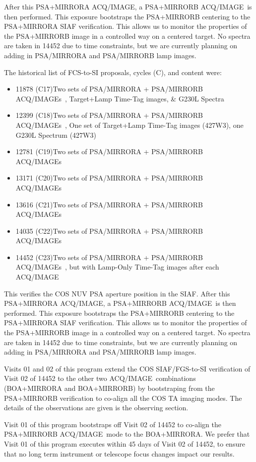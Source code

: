 \documentclass[12pt]{reportj}
\newcommand*{\myfont}{\fontfamily{rm}\selectfont}
\def\acqimageno{{\myfont ACQ/IMAGE}\rm}
\def\acqimage{{\myfont ACQ/IMAGE}\rm~}
\def\acqimages{{\myfont ACQ/IMAGE{\rm s}}\rm~}
\begin{document}
After this PSA+MIRRORA \acqimageno, a PSA+MIRRORB \acqimage is then performed.
This exposure bootstraps the PSA+MIRRORB centering to the PSA+MIRRORA SIAF verification.
This allows us to monitor the properties of the PSA+MIRRORB image in a controlled way on a centered target.
No spectra are taken in 14452 due to time constraints, but we are currently planning on adding in PSA/MIRRORA and PSA/MIRRORB lamp images.

The historical list of FCS-to-SI proposals, cycles (C), and content were:
\begin{itemize}
	\item{11878 (C17)}{Two sets of PSA/MIRRORA + PSA/MIRRORB \acqimages, Target+Lamp Time-Tag images, \& G230L Spectra}
	\item{12399 (C18)}{Two sets of PSA/MIRRORA + PSA/MIRRORB \acqimages, One set of Target+Lamp Time-Tag images (427W3), one G230L Spectrum (427W3)}
	\item{12781 (C19)}{Two sets of PSA/MIRRORA + PSA/MIRRORB \acqimages}
	\item{13171 (C20)}{Two sets of PSA/MIRRORA + PSA/MIRRORB \acqimages}
	\item{13616 (C21)}{Two sets of PSA/MIRRORA + PSA/MIRRORB \acqimages}
	\item{14035 (C22)}{Two sets of PSA/MIRRORA + PSA/MIRRORB \acqimages}
	\item{14452 (C23)}{Two sets of PSA/MIRRORA + PSA/MIRRORB \acqimages, but with Lamp-Only Time-Tag images after each \acqimage}
\end{itemize}

This verifies the COS NUV PSA aperture position in the SIAF. After this PSA+MIRRORA \acqimageno, a PSA+MIRRORB \acqimage is then performed.
This exposure bootstraps the PSA+MIRRORB centering to the PSA+MIRRORA SIAF verification.
This allows us to monitor the properties of the PSA+MIRRORB image in a controlled way on a centered target.
No spectra are taken in 14452 due to time constraints, but we are currently planning on adding in PSA/MIRRORA and PSA/MIRRORB lamp images.

Visits 01 and 02 of this program extend the COS SIAF/FGS-to-SI verification of Visit 02 of 14452 to the other two \acqimage combinations (BOA+MIRRORA and BOA+MIRRORB) by bootstraping from the PSA+MIRRORB verification to co-align all the COS TA imaging modes.
The details of the observations are given is the observing section.

Visit 01 of this program bootstraps off Visit 02 of 14452  to co-align the PSA+MIRRORB \acqimage mode to the BOA+MIRRORA.
We prefer that Visit 01 of this program executes within 45 days of Visit 02 of 14452, to ensure that no long term instrument or telescope focus changes impact our results.
\end{document}
